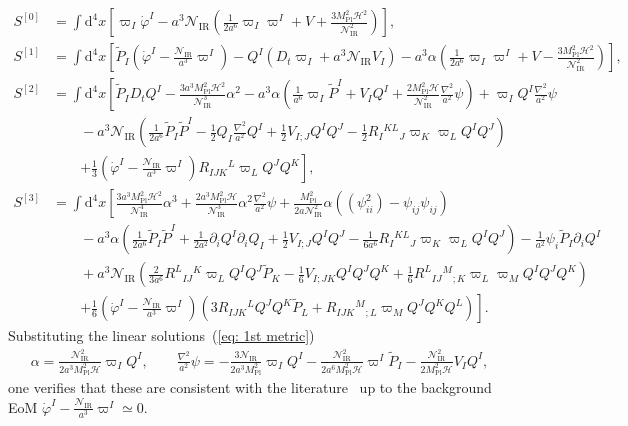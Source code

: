 \documentclass[aps, prd
, preprint
, nofootinbib 
, longbibliography
]{revtex4-1}
\newcommand{\dd}{\mathrm{d}}
\newcommand{\Mpl}{M_\mathrm{Pl}}
\newcommand{\IR}{\mathrm{IR}}
\newcommand{\calH}{\mathcal{H}}
\newcommand{\calN}{\mathcal{N}}
\newcommand{\bae}[1]{\begin{align} #1 \end{align}}
\begin{document}
\bae{
	S^{[0]}&=\int\dd^4x\left[\varpi_I\dot{\varphi}^I-a^3\calN_\IR\left(\frac{1}{2a^6}\varpi_I\varpi^I+V+\frac{3\Mpl^2\calH^2}{\calN_\IR^2}\right)\right], \\
	S^{[1]}&=\int\dd^4x\left[\tilde{P}_I\left(\dot{\varphi}^I-\frac{\calN_\IR}{a^3}\varpi^I\right)-Q^I\left(D_t\varpi_I+a^3\calN_\IR V_I\right)
	-a^3\alpha\left(\frac{1}{2a^6}\varpi_I\varpi^I+V-\frac{3\Mpl^2\calH^2}{\calN_\IR^2}\right)\right], \label{eq: S^[1] trs} \\
	S^{[2]}&=\int\dd^4x\left[\tilde{P}_ID_tQ^I-\frac{3a^3\Mpl^2\calH^2}{\calN_\IR^3}\alpha^2
	-a^3\alpha\left(\frac{1}{a^6}\varpi_I\tilde{P}^I+V_IQ^I+\frac{2\Mpl^2\calH}{\calN_\IR^2}\frac{\nabla^2}{a^2}\psi\right)+\varpi_IQ^I\frac{\nabla^2}{a^2}\psi \right. \nonumber \\
	&\qquad-a^3\calN_\IR\left(\frac{1}{2a^6}\tilde{P}_I\tilde{P}^I-\frac{1}{2}Q_I\frac{\nabla^2}{a^2}Q^I+\frac{1}{2}V_{I;J}Q^IQ^J
	-\frac{1}{2}R_I{}^{KL}{}_J\varpi_K\varpi_LQ^IQ^J\right) \nonumber \\
	&\qquad\left.+\frac{1}{3}\left(\dot{\varphi}^I-\frac{\calN_\IR}{a^3}\varpi^I\right)R_{IJK}{}^L\varpi_LQ^JQ^K\right], \label{eq: S^[2] trs} \\
	S^{[3]}&=\int\dd^4x\left[\frac{3a^3\Mpl^2\calH^2}{\calN_\IR^4}\alpha^3+\frac{2a^3\Mpl^2\calH}{\calN_\IR^3}\alpha^2\frac{\nabla^2}{a^2}\psi+\frac{\Mpl^2}{2a\calN_\IR^2}\alpha\left((\psi_{ii}^2)-\psi_{ij}\psi_{ij}\right) \right. \nonumber \\
	&\qquad-a^3\alpha\left(\frac{1}{2a^6}\tilde{P}_I\tilde{P}^I+\frac{1}{2a^2}\partial_iQ^I\partial_iQ_I+\frac{1}{2}V_{I;J}Q^IQ^J-\frac{1}{6a^6}R_I{}^{KL}{}_J\varpi_K\varpi_LQ^IQ^J\right)-\frac{1}{a^2}\psi_i\tilde{P}_I\partial_iQ^I \nonumber \\
	&\qquad+a^3\calN_\IR\left(\frac{2}{3a^6}R^L{}_{IJ}{}^K\varpi_LQ^IQ^J\tilde{P}_K-\frac{1}{6}V_{I;JK}Q^IQ^JQ^K+\frac{1}{6}R^L{}_{IJ}{}^M{}_{;K}\varpi_L\varpi_MQ^IQ^JQ^K\right) \nonumber \\
	&\qquad\left.+\frac{1}{6}\left(\dot{\varphi}^I-\frac{\calN_\IR}{a^3}\varpi^I\right)\left(3R_{IJK}{}^LQ^JQ^K\tilde{P}_L+R_{IJK}{}^M{}_{;L}\varpi_MQ^JQ^KQ^L\right)\right].
}
Substituting the linear solutions~(\ref{eq: 1st metric})
\bae{
    \alpha=\frac{\calN_\IR^2}{2a^3\Mpl^2\calH}\varpi_IQ^I, \qquad
    \frac{\nabla^2}{a^2}\psi=-\frac{3\calN_\IR}{2a^3\Mpl^2}\varpi_IQ^I-\frac{\calN_\IR^2}{2a^6\Mpl^2\calH}\varpi^I\tilde{P}_I-\frac{\calN_\IR^2}{2\Mpl^2\calH}V_IQ^I,
}
one verifies that these are consistent with the literature~\cite{Butchers:2018hds} up to the background EoM $\dot{\varphi}^I-\frac{\calN_\IR}{a^3}\varpi^I\simeq0$.
\end{document}
